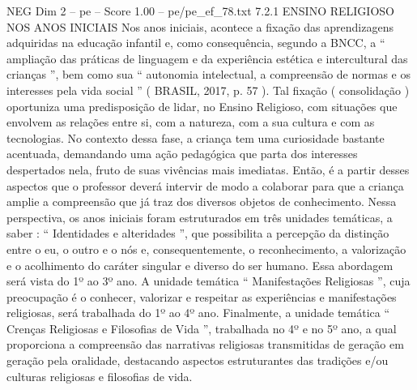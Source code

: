 \begin{textsample}{NEG Dim 2 – pe – Score 1.00 – pe/pe\_ef\_78.txt}  \label{ex:f2_neg_037}
7.2.1 ENSINO RELIGIOSO NOS ANOS INICIAIS Nos anos iniciais, acontece a fixação das aprendizagens adquiridas na educação infantil e, como consequência, segundo a BNCC, a “ ampliação das práticas de linguagem e da experiência estética e intercultural das crianças ”, bem como sua “ autonomia intelectual, a compreensão de normas e os interesses pela vida social ” ( BRASIL, 2017, p. 57 ).
Tal fixação ( consolidação ) oportuniza uma predisposição de lidar, no Ensino Religioso, com situações que envolvem as relações entre si, com a natureza, com a sua cultura e com as tecnologias.
No contexto dessa fase, a criança tem uma curiosidade bastante acentuada, demandando uma ação pedagógica que parta dos interesses despertados nela, fruto de suas vivências mais imediatas.
Então, é a partir desses aspectos que o professor deverá intervir de modo a colaborar para que a criança amplie a compreensão que já traz dos diversos objetos de conhecimento.
Nessa perspectiva, os anos iniciais foram estruturados em três unidades temáticas, a saber : “ Identidades e alteridades ”, que possibilita a percepção da distinção entre o eu, o outro e o nós e, consequentemente, o reconhecimento, a valorização e o acolhimento do caráter singular e diverso do ser humano.
Essa abordagem será vista do 1º ao 3º ano.
A unidade temática “ Manifestações Religiosas ”, cuja preocupação é o conhecer, valorizar e respeitar as experiências e manifestações religiosas, será trabalhada do 1º ao 4º ano.
Finalmente, a unidade temática “ Crenças Religiosas e Filosofias de Vida ”, trabalhada no 4º e no 5º ano, a qual proporciona a compreensão das narrativas religiosas transmitidas de geração em geração pela oralidade, destacando aspectos estruturantes das tradições e/ou culturas religiosas e filosofias de vida.

\end{textsample}
